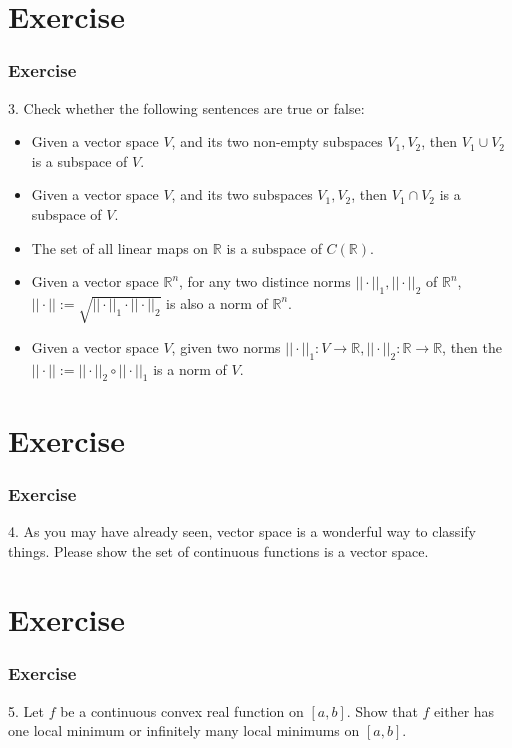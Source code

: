 \documentclass[12pt, t]{beamer}
\begin{document}
\section{Exercise}
\begin{frame}
    \frametitle{Exercise}
    3. Check whether the following sentences are true or false:
    \begin{itemize}
        \item Given a vector space $V$, and its two non-empty subspaces $V_1, V_2$, then $V_1\cup V_2$ is a subspace of $V$.
        \item Given a vector space $V$, and its two subspaces $V_1,V_2$, then $V_1\cap V_2$ is a subspace of $V$.
        \item The set of all linear maps on $\mathbb{R}$ is a subspace of $C(\mathbb{R})$.
        \item Given a vector space $\mathbb{R}^n$, for any two distince norms $||\cdot||_1, ||\cdot||_2$ of $\mathbb{R}^n$, $||\cdot||:=\sqrt{||\cdot||_1\cdot||\cdot||_2}$ is also a norm of $\mathbb{R}^n$.
        \item Given a vector space $V$, given two norms $||\cdot||_1:V\rightarrow\mathbb{R}, ||\cdot||_2:\mathbb{R}\rightarrow\mathbb{R}$, then the $||\cdot||:=||\cdot||_2\circ||\cdot||_1$ is a norm of $V$.
    \end{itemize}
\end{frame}

\section{Exercise}
\begin{frame}
    \frametitle{Exercise}
    4. As you may have already seen, vector space is a wonderful way to classify things. Please show the set of continuous functions is a vector space.
\end{frame}

\section{Exercise}
\begin{frame}
    \frametitle{Exercise}
    5. Let $f$ be a continuous convex real function on $[a,b]$. Show that $f$ either has one local minimum or infinitely many local minimums on $[a,b]$.
\end{frame}
\end{document}
